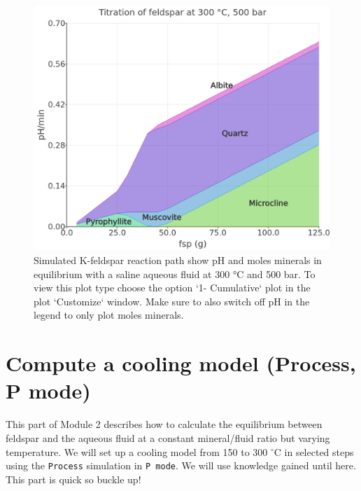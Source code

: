 \documentclass[
]{book}
\begin{document}
\begin{figure}
\includegraphics[width=0.8\linewidth]{figures/module2/fig-17} \caption{Simulated K-feldspar reaction path show pH and moles minerals in equilibrium with a saline aqueous fluid at 300 °C and 500 bar. To view this plot type choose the option `1- Cumulative` plot in the plot `Customize` window. Make sure to also switch off pH in the legend to only plot moles minerals.}\label{fig:fig-17b}
\end{figure}

\hypertarget{compute-a-cooling-model-process-p-mode}{%
\section{Compute a cooling model (Process, P mode)}\label{compute-a-cooling-model-process-p-mode}}

This part of Module 2 describes how to calculate the equilibrium between feldspar and the aqueous fluid at a constant mineral/fluid ratio but varying temperature. We will set up a cooling model from 150 to 300 \(^\circ\)C in selected steps using the \texttt{Process} simulation in \texttt{P\ mode}. We will use knowledge gained until here. This part is quick so buckle up!
\end{document}

